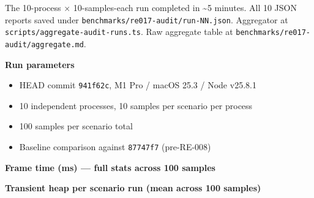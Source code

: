 The 10-process × 10-samples-each run completed in \textasciitilde5 minutes. All 10 JSON reports saved under \texttt{b\allowbreak{}e\allowbreak{}n\allowbreak{}c\allowbreak{}h\allowbreak{}m\allowbreak{}a\allowbreak{}r\allowbreak{}k\allowbreak{}s\allowbreak{}/\allowbreak{}r\allowbreak{}e\allowbreak{}0\allowbreak{}1\allowbreak{}7\allowbreak{}-\allowbreak{}a\allowbreak{}u\allowbreak{}d\allowbreak{}i\allowbreak{}t\allowbreak{}/\allowbreak{}r\allowbreak{}u\allowbreak{}n\allowbreak{}-\allowbreak{}N\allowbreak{}N\allowbreak{}.\allowbreak{}j\allowbreak{}s\allowbreak{}o\allowbreak{}n}. Aggregator at \texttt{s\allowbreak{}c\allowbreak{}r\allowbreak{}i\allowbreak{}p\allowbreak{}t\allowbreak{}s\allowbreak{}/\allowbreak{}a\allowbreak{}g\allowbreak{}g\allowbreak{}r\allowbreak{}e\allowbreak{}g\allowbreak{}a\allowbreak{}t\allowbreak{}e\allowbreak{}-\allowbreak{}a\allowbreak{}u\allowbreak{}d\allowbreak{}i\allowbreak{}t\allowbreak{}-\allowbreak{}r\allowbreak{}u\allowbreak{}n\allowbreak{}s\allowbreak{}.\allowbreak{}t\allowbreak{}s}. Raw aggregate table at \texttt{b\allowbreak{}e\allowbreak{}n\allowbreak{}c\allowbreak{}h\allowbreak{}m\allowbreak{}a\allowbreak{}r\allowbreak{}k\allowbreak{}s\allowbreak{}/\allowbreak{}r\allowbreak{}e\allowbreak{}0\allowbreak{}1\allowbreak{}7\allowbreak{}-\allowbreak{}a\allowbreak{}u\allowbreak{}d\allowbreak{}i\allowbreak{}t\allowbreak{}/\allowbreak{}a\allowbreak{}g\allowbreak{}g\allowbreak{}r\allowbreak{}e\allowbreak{}g\allowbreak{}a\allowbreak{}t\allowbreak{}e\allowbreak{}.\allowbreak{}m\allowbreak{}d}.

\textbf{Run parameters}

\begin{itemize}
\tightlist
\item
  HEAD commit \texttt{9\allowbreak{}4\allowbreak{}1\allowbreak{}f\allowbreak{}6\allowbreak{}2\allowbreak{}c}, M1 Pro / macOS 25.3 / Node v25.8.1
\item
  10 independent processes, 10 samples per scenario per process
\item
  100 samples per scenario total
\item
  Baseline comparison against \texttt{8\allowbreak{}7\allowbreak{}7\allowbreak{}4\allowbreak{}7\allowbreak{}f\allowbreak{}7} (pre-RE-008)
\end{itemize}

\textbf{Frame time (ms) --- full stats across 100 samples}



\textbf{Transient heap per scenario run (mean across 100 samples)}

